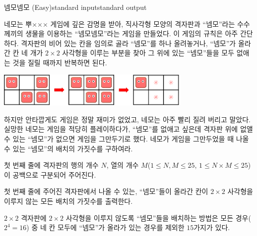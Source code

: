 \begin{problem}{넴모넴모 (Easy)}{standard input}{standard output}

네모는 뿌××× 게임에 깊은 감명을 받아, 직사각형 모양의 격자판과 ``넴모''라는 수수께끼의 생물을 이용하는 ``넴모넴모''라는 게임을 만들었다. 이 게임의 규칙은 아주 간단하다. 격자판의 비어 있는 칸을 임의로 골라 ``넴모''를 하나 올려놓거나, ``넴모''가 올라간 칸 네 개가 $2 \times 2$ 사각형을 이루는 부분을 찾아 그 위에 있는 ``넴모''들을 모두 없애는 것을 질릴 때까지 반복하면 된다.

\begin{center}
  \includegraphics[width=0.7\textwidth]{nemo.png}
\end{center}

하지만 안타깝게도 게임은 정말 재미가 없었고, 네모는 아주 빨리 질려 버리고 말았다. 실망한 네모는 게임을 적당히 플레이하다가, ``넴모''를 없애고 싶은데 격자판 위에 없앨 수 있는 ``넴모''가 없으면 게임을 그만두기로 했다. 네모가 게임을 그만두었을 때 나올 수 있는 ``넴모''의 배치의 가짓수를 구하여라.

\InputFile
첫 번째 줄에 격자판의 행의 개수 $N$, 열의 개수 $M$($1 \le N, M \le 25$, $1 \le N \times M \le 25$)이 공백으로 구분되어 주어진다.

\OutputFile
첫 번째 줄에 주어진 격자판에서 나올 수 있는, ``넴모''들이 올라간 칸이 $2 \times 2$ 사각형을 이루지 않는 모든 배치의 가짓수를 출력한다.

\Example

\begin{example}
%
%
%
\end{example}

\Notes
$2 \times 2$ 격자판에 $2 \times 2$ 사각형을 이루지 않도록 ``넴모''들을 배치하는 방법은 모든 경우($2^{4}=16$) 중 네 칸 모두에 ``넴모''가 올라가 있는 경우를 제외한 $15$가지가 있다.

\end{problem}
